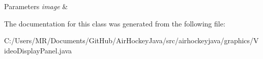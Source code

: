 \begin{DoxyParams}{Parameters}
{\em image} & \\
\hline
\end{DoxyParams}


The documentation for this class was generated from the following file\+:\begin{DoxyCompactItemize}
\item 
C\+:/\+Users/\+M\+R/\+Documents/\+Git\+Hub/\+Air\+Hockey\+Java/src/airhockeyjava/graphics/Video\+Display\+Panel.\+java\end{DoxyCompactItemize}
